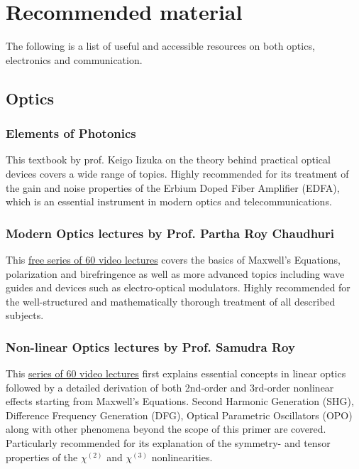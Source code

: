 \chapter{Recommended material}
\label{ch:material}
The following is a list of useful and accessible resources on both optics, electronics and communication. 

\section{Optics}

\subsection*{Elements of Photonics}
This textbook by prof. Keigo Iizuka on the theory behind practical optical devices covers a wide range of topics. Highly recommended for its treatment of the gain and noise properties of the Erbium Doped Fiber Amplifier (EDFA), which is an essential instrument in modern optics and telecommunications. 


\subsection*{Modern Optics lectures by Prof. Partha Roy Chaudhuri}
This \href{https://www.youtube.com/watch?v=2WiMeh1Dxl8&list=PLbRMhDVUMngePMuAGeAUeGVuZffTFY-5i}{free series of 60 video lectures} covers the basics of Maxwell's Equations, polarization and birefringence as well as more advanced topics including wave guides and devices such as electro-optical modulators. Highly recommended for the well-structured and mathematically thorough treatment of all described subjects. 

\subsection*{Non-linear Optics lectures by Prof. Samudra Roy}
This \href{https://www.youtube.com/watch?v=EiIDScj124Q&list=PLbRMhDVUMngfBwyonVP8VIsabtnsV3GVv}{series of 60 video lectures} first explains essential concepts in linear optics followed by a detailed derivation of both 2nd-order and 3rd-order nonlinear effects starting from Maxwell's Equations. Second Harmonic Generation (SHG), Difference Frequency Generation (DFG), Optical Parametric Oscillators (OPO) along with other phenomena beyond the scope of this primer are covered. Particularly recommended for its explanation of the symmetry- and tensor properties of the $\chi^{(2)}$ and $\chi^{(3)}$ nonlinearities. 

